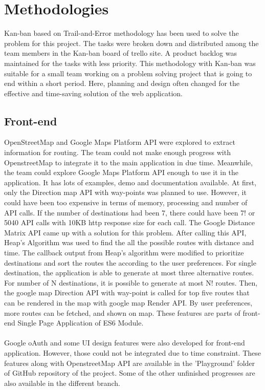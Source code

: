 \documentclass{article}
\begin{document}
\section{Methodologies}

Kan-ban based on Trail-and-Error methodology has been used to solve the problem for this project. The tasks were broken down and distributed among the team members in the Kan-ban board of trello site. A product backlog was maintained for the tasks with less priority. This methodology with Kan-ban was suitable for a small team working on a problem solving project that is going to end within a short period. Here, planning and design often changed for the effective and time-saving solution of the web application.

\subsection{Front-end}
OpenStreetMap and Google Maps Platform API were explored to extract information for routing. The team could not make enough progress with OpenstreetMap to integrate it to the main application in due time. Meanwhile, the team could explore Google Maps Platform API enough to use it in the application. It has lots of examples, demo and documentation available. At first, only the Direction map API with way-points was planned to use. However, it could have been too expensive in terms of memory, processing and number of API calls. If the number of destinations had been 7, there could have been 7! or 5040 API calls with 10KB http response size for each call. The Google Distance Matrix API came up with a solution for this problem. After calling this API,  Heap's Algorithm was used to find the all the possible routes with distance and time. The callback output from Heap's algorithm were modified to prioritize destinations and sort the routes the according to the user preferences. For single destination, the application is able to generate at most three alternative routes. For number of N destinations, it is possible to generate at most N! routes. Then, the google map Direction API with way-point is called for top five routes that can be rendered in the map with google map Render API. By user preferences, more routes can be fetched, and shown on map. These features are parts of front-end Single Page Application of ES6 Module.
\\
\\
Google oAuth and some UI design features were also developed for front-end application. However, those could not be integrated due to time constraint. These features along with OpenstreetMap API are available in the 'Playground' folder of GitHub repository of the project. Some of the other unfinished progresses are also available in the different branch. 
\end{document}
